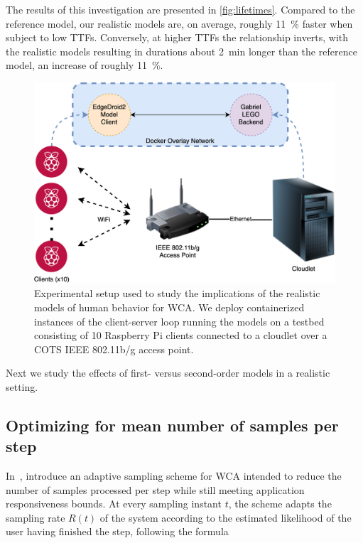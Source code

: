 The results of this investigation are presented in \cref{fig:lifetimes}.
Compared to the reference model, our realistic models are, on average, roughly \SI{11}{\percent} faster when subject to low \acp{TTF}.
Conversely, at higher \acp{TTF} the relationship inverts, with the realistic models resulting in durations about \SI{2}{\minute} longer than the reference model, an increase of roughly \SI{11}{\percent}.


\begin{figure}
    \centering
    \includegraphics[width=\columnwidth]{figs/EdgeDroid2ExperimentalSetup.png}
    \caption{%
        Experimental setup used to study the implications of the realistic models of human behavior for \ac{WCA}.
        We deploy containerized instances of the client-server loop running the models on a testbed consisting of \num{10} Raspberry Pi clients connected to a cloudlet over a \ac{COTS} \acs{IEEE} \num{802.11}b/g access point.
    }\label{fig:expsetup}
\end{figure}

Next we study the effects of first- versus second-order models in a realistic setting.

\subsection{Optimizing for mean number of samples per step}

In~\cite{Wang2019Towards}, \citeauthor{Wang2019Towards} introduce an adaptive sampling scheme for \ac{WCA} intended to reduce the number of samples processed per step while still meeting application responsiveness bounds.
At every sampling instant \( t \), the scheme adapts the sampling rate \( R(t) \) of the system according to the estimated likelihood of the user having finished the step,
following the formula 

